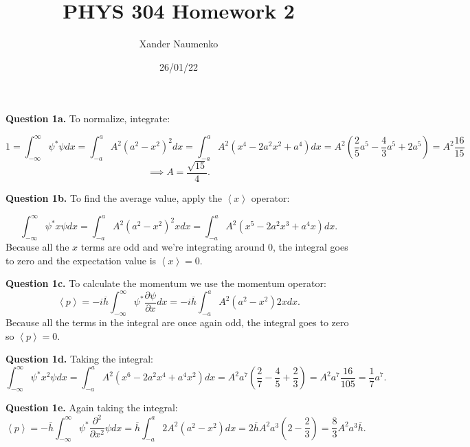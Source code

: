 \documentclass[letterpaper, reqno,11pt]{article}
\begin{document}
\title{PHYS 304 Homework 2}
\date{26/01/22}
\author{Xander Naumenko}
\maketitle

{\noindent\bf Question 1a.} To normalize, integrate: 

\[
1=\int_{-\infty}^{\infty}\psi^*\psi dx=\int_{-a}^{a}A^2(a^2-x^2)^2dx=\int_{-a}^aA^2(x^{4}-2a^2x^2+a^{4})dx=A^2\left( \frac{2}{5}a^{5}-\frac{4}{3}a^{5}+2a^{5} \right) =A^2 \frac{16}{15}
\]
\[
\implies A=\frac{\sqrt{15}}{4}
.\]

{\noindent\bf Question 1b.} To find the average value, apply the $ \left<x \right>$ operator: 

\[
\int_{-\infty}^{\infty}\psi^* x\psi dx=\int_{-a}^{a}A^2(a^2-x^2)^2 xdx=\int_{-a}^aA^2(x^{5}-2a^2x^3+a^{4}x)dx
.\]
Because all the $x$ terms are odd and we're integrating around $0$, the integral goes to zero and the expectation value is $ \left<x \right>=0$. 

{\noindent\bf Question 1c.} To calculate the momentum we use the momentum operator: 
\[
\left<p \right>=-i\overline{h}\int_{-\infty}^{\infty}\psi^*\frac{\partial\psi}{\partial x}dx=-i\overline{h}\int_{-a}^a A^2(a^2-x^2)2xdx
.\]
Because all the terms in the integral are once again odd, the integral goes to zero so $ \left<p \right>=0$. 

{\noindent\bf Question 1d.} Taking the integral: 
\[
\int_{-\infty}^{\infty}\psi^* x^2\psi dx=\int_{-a}^{a}A^2(x^{6}-2a^2x^{4}+a^{4}x^2)dx=A^2a^{7}\left( \frac{2}{7}-\frac{4}{5}+\frac{2}{3}\right)=A^2a^{7}\frac{16}{105}=\frac{1}{7}a^{7}
.\]

{\noindent\bf Question 1e.} Again taking the integral: 
\[
\left<p \right>=-\overline{h}\int_{-\infty}^{\infty}\psi^* \frac{\partial^2}{\partial x^2}\psi dx=\overline{h}\int_{-a}^{a}2A^2(a^2-x^2)dx=2\overline{h}A^2a^{3}\left( 2-\frac{2}{3} \right) =\frac{8}{3}A^2a^{3}\overline{h}
.\]
\end{document}
